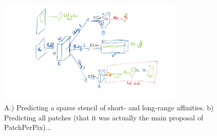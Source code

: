 





\begin{figure}[t]
\centering
        \includegraphics[width=0.8\textwidth]{./figs/main_image.jpg} %
        \caption{A.) Predicting a sparse stencil of short- and long-range affinities. b) Predicting all patches (that it was actually the main proposal of PatchPerPix)...}
    \label{fig:main_figure}
\end{figure}


